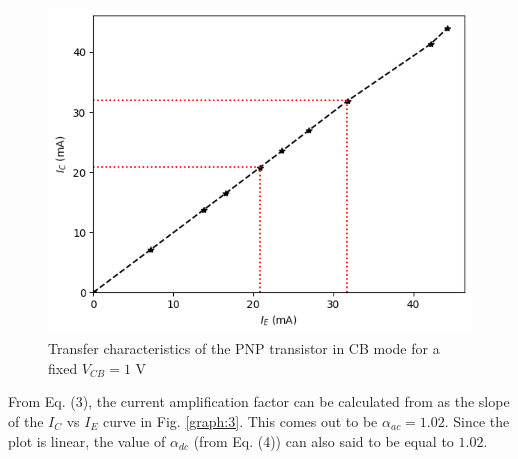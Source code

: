     \begin{figure}[H]
        \centering
        \includegraphics[width=1\columnwidth]{images/g6.png}
        \caption{Transfer characteristics of the PNP transistor in CB mode for a fixed $V_{CB}=1$ V}
        \label{graph:6}
    \end{figure}

    From Eq. (3), the current amplification factor can be calculated from as the slope of the $I_C$ vs $I_E$ curve in  Fig. \ref{graph:3}. This comes out to be $\alpha_{ac}=1.02$. Since the plot is linear, the value of $\alpha_{dc}$ (from Eq. (4)) can also said to be equal to $1.02$.

